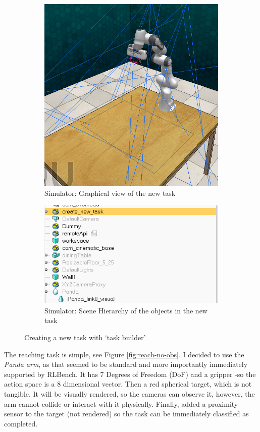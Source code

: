 \begin{figure}[htbp]
  \centering
  \begin{subfigure}{0.40\linewidth}
    \centering
    \includegraphics[width=0.4\linewidth]{assets/early-work/task-builder-scene.png}
    \caption{Simulator: Graphical view of the new task}
  \end{subfigure}%
  \begin{subfigure}{0.40\linewidth}
    \centering
    \includegraphics[width=0.6\linewidth]{assets/early-work/task-builder-scene-hierarchy.png}
    \caption{Simulator: Scene Hierarchy of the objects in the new task}
  \end{subfigure}
  \caption{Creating a new task with `task builder'}\label{fig:task-builder}
\end{figure}

The reaching task is simple, see Figure \ref{fig:reach-no-obs}. I decided to use the \emph{Panda arm}, as that seemed to be standard and more importantly immediately supported by RLBench. It has 7 Degrees of Freedom (DoF) and a gripper -so the action space is a 8 dimensional vector. Then a red spherical target, which is not tangible. It will be visually rendered, so the cameras can observe it, however, the arm cannot collide or interact with it physically. Finally, added a proximity sensor to the target (not rendered) so the task can be immediately classified as completed.

